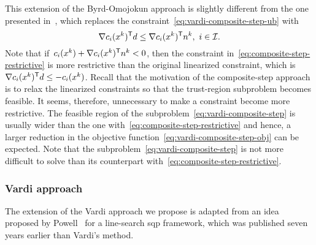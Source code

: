 This extension of the Byrd-Omojokun approach is slightly different from the one presented in~\cite[\S~15.4.4]{Conn_Gould_Toint_2000}, which replaces the constraint~\cref{eq:vardi-composite-step-ub} with
\begin{equation}
    \label{eq:composite-step-restrictive}
    \nabla \con{i}(\iter[k])^{\T} \step \le \nabla \con{i}(\iter[k])^{\T} \nstep[k], ~ i \in \iub.
\end{equation}
Note that if~$\con{i}(\iter[k]) + \nabla \con{i}(\iter[k])^{\T} \nstep[k] < 0$, then the constraint in~\cref{eq:composite-step-restrictive} is more restrictive than the original linearized constraint, which is~$\nabla \con{i}(\iter[k])^{\T} \step \le -\con{i}(\iter[k])$.
Recall that the motivation of the composite-step approach is to relax the linearized constraints so that the trust-region subproblem becomes feasible.
It seems, therefore, unnecessary to make a constraint become more restrictive.
The feasible region of the subproblem~\cref{eq:vardi-composite-step} is usually wider than the one with~\cref{eq:composite-step-restrictive} and hence, a larger reduction in the objective function~\cref{eq:vardi-composite-step-obj} can be expected.
Note that the subproblem~\cref{eq:vardi-composite-step} is not more difficult to solve than its counterpart with~\cref{eq:composite-step-restrictive}.

\subsubsection{Vardi approach}

The extension of the Vardi approach we propose is adapted from an idea proposed by Powell~\cite[Eqs.~(2.7) and~(2.8)]{Powell_1978a} for a line-search \gls{sqp} framework, which was published seven years earlier than Vardi's method.

